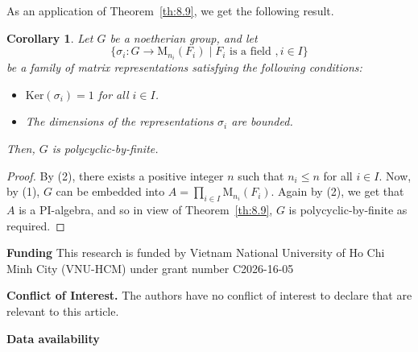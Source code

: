 \documentclass{amsart}
\newtheorem{corollary}[theorem]{Corollary}
\theoremstyle{definition}
\begin{document}
As an application of Theorem~\ref{th:8.9}, we get the following result.
\begin{corollary}\label{cor:8.10} Let $G$ be a noetherian group, and let $$\{\sigma_{i}: G\longrightarrow \mathrm{M}_{n_i}(F_i)\mid F_i \text{ is a field }, i\in I\}$$ be a family of matrix representations satisfying the following conditions:
	\begin{itemize} 
		\item [(1)] $\mathrm{Ker}(\sigma_i)=1$ for all $i\in I$.
		\item [(2)] The dimensions of the representations $\sigma_i$ are bounded.
	\end{itemize}
	Then, $G$ is polycyclic-by-finite.
\end{corollary}
\begin{proof} By (2), there exists a positive integer $n$ such that $n_i\leq n$ for all $i\in I.$ Now, by (1), $G$ can be embedded into $A=\prod_{i\in I}\mathrm{M}_{n_i}(F_i).$ Again by (2), we get that $A$ is a $\mathrm{PI}$-algebra, and so in view of Theorem~\ref{th:8.9}, $G$ is polycyclic-by-finite as required. 
\end{proof}
\bigskip

{\noindent\textbf{Funding} }This research is funded by Vietnam National University of Ho Chi Minh City (VNU-HCM) under grant number C2026-16-05

\bigskip 

{\noindent\textbf{Conflict of Interest.} }The authors have no conflict of interest to declare that are relevant to this article.

\bigskip

{\noindent\textbf{Data availability}}
\bigskip
\end{document}
